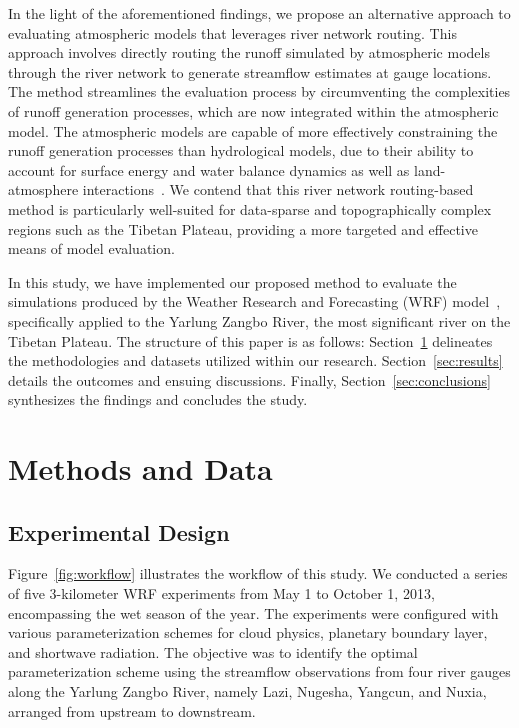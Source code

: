 \documentclass[draft]{agujournal2019}
\begin{document}
In the light of the aforementioned findings, we propose an alternative approach to evaluating atmospheric models that leverages river network routing. This approach involves directly routing the runoff simulated by atmospheric models through the river network to generate streamflow estimates at gauge locations. The method streamlines the evaluation process by circumventing the complexities of runoff generation processes, which are now integrated within the atmospheric model. The atmospheric models are capable of more effectively constraining the runoff generation processes than hydrological models, due to their ability to account for surface energy and water balance dynamics as well as land-atmosphere interactions~\cite{wagner2016WRR, senatore2015JAMES}. We contend that this river network routing-based method is particularly well-suited for data-sparse and topographically complex regions such as the Tibetan Plateau, providing a more targeted and effective means of model evaluation.

In this study, we have implemented our proposed method to evaluate the simulations produced by the Weather Research and Forecasting (WRF) model~\cite{powers2017BAMS}, specifically applied to the Yarlung Zangbo River, the most significant river on the Tibetan Plateau. The structure of this paper is as follows: Section~\ref{sec:methods} delineates the methodologies and datasets utilized within our research. Section~\ref{sec:results} details the outcomes and ensuing discussions. Finally, Section~\ref{sec:conclusions} synthesizes the findings and concludes the study.

\section{Methods and Data}
\label{sec:methods}

\subsection{Experimental Design}
\label{sec:design}

Figure~\ref{fig:workflow} illustrates the workflow of this study. We conducted a series of five 3-kilometer WRF experiments from May 1 to October 1, 2013, encompassing the wet season of the year. The experiments were configured with various parameterization schemes for cloud physics, planetary boundary layer, and shortwave radiation. The objective was to identify the optimal parameterization scheme using the streamflow observations from four river gauges along the Yarlung Zangbo River, namely Lazi, Nugesha, Yangcun, and Nuxia, arranged from upstream to downstream.
\end{document}
